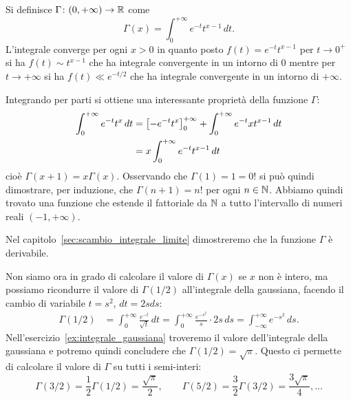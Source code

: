 \begin{example}%
  \label{ex:gamma_eulero}%
  Si definisce $\Gamma\colon (0,+\infty) \to {\mathbb R}$ come
  \[
    \Gamma(x) = \int_0^{+\infty} e^{-t} t^{x-1}\, dt.
  \]
  L'integrale converge per ogni $x>0$ in quanto posto
  $f(t) = e^{-t} t^{x-1}$ per $t\to 0^+$ si ha $f(t) \sim t^{x-1}$ che ha
  integrale convergente in un intorno di $0$ mentre per $t\to +\infty$ si ha
  $f(t) \ll e^{-t/2}$ che ha integrale convergente in un intorno di $+\infty$.
  
  Integrando per parti si ottiene una interessante proprietà della funzione $\Gamma$:
  \begin{align*}
  \int_0^{+\infty} e^{-t}t^{x}\, dt
  &= {\left[ -e^{-t}t^{x} \right]}_0^{+\infty}
  + \int_0^{+\infty} e^{-t}xt^{x-1}\, dt\\
  &= x\int_0^{+\infty} e^{-t}t^{x-1}\, dt
  \end{align*}
  cioè $\Gamma(x+1) = x\Gamma(x)$.
  Osservando che $\Gamma(1)=1=0!$ si può quindi dimostrare, per induzione,
  che $\Gamma(n+1) = n!$ per ogni $n\in {\mathbb N}$.
  Abbiamo quindi trovato una funzione che estende il fattoriale
  da ${\mathbb N}$ a tutto l'intervallo di numeri reali $(-1,+\infty)$.
  
  Nel capitolo~\ref{sec:scambio_integrale_limite} dimostreremo 
  che la funzione $\Gamma$ è derivabile.
  
  Non siamo ora in grado di calcolare il valore di $\Gamma(x)$ se $x$ 
  non è intero, ma possiamo ricondurre il valore di $\Gamma(1/2)$ 
  all'integrale della gaussiana, facendo il cambio 
  di variabile $t=s^2$, $dt=2s ds$:
  \begin{align*}
  \Gamma(1/2) 
  &= \int_0^{+\infty} \frac{e^{-t}}{\sqrt t}\, dt  
  = \int_0^{+\infty} \frac{e^{-s^2}}{s} \cdot 2s\, ds
  = \int_{-\infty}^{+\infty} e^{-s^2}\, ds.
  \end{align*}
  Nell'esercizio~\ref{ex:integrale_gaussiana} troveremo il valore 
  dell'integrale della gaussiana e potremo 
  quindi concludere che $\Gamma(1/2) = \sqrt \pi$.
  Questo ci permette di calcolare il valore di $\Gamma$ su 
  tutti i semi-interi:
  \[
  \Gamma(3/2) = \frac 1 2 \Gamma(1/2) = \frac{\sqrt \pi}{2}, \qquad
  \Gamma(5/2) = \frac 3 2 \Gamma(3/2) = \frac{3\sqrt \pi}{4}, \dots 
  \]
\end{example}
    
